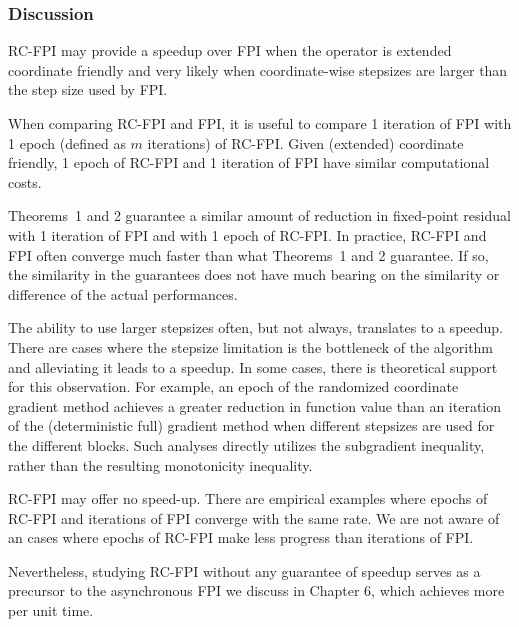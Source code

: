 \documentclass[10pt,mathserif]{beamer}
\begin{document}
\iffalse
\begin{frame}
\frametitle{Discussion}
RC-FPI may provide a speedup over FPI when the operator is extended coordinate friendly
and very likely when coordinate-wise stepsizes are larger than the step size used by FPI.

\vspace{0.2in}

When comparing RC-FPI and FPI, it is useful to compare 1 iteration of FPI with 1 epoch (defined as $m$ iterations) of RC-FPI. Given (extended) coordinate friendly, 1 epoch of RC-FPI and 1 iteration of FPI have similar computational costs.

\vspace{0.2in}
Theorems~1 and 2 guarantee a similar amount of reduction in fixed-point residual with 1 iteration of FPI and with 1 epoch of RC-FPI.
In practice, RC-FPI and FPI often converge much faster than what Theorems~1 and 2 guarantee.
If so, the similarity in the guarantees does not have much bearing on the similarity or difference of the actual performances.
\end{frame}

\begin{frame}
The ability to use larger stepsizes often, but not always, translates to a speedup.
There are cases where the stepsize limitation is the bottleneck of the algorithm and alleviating it leads to a speedup.
In some cases, there is theoretical support for this observation.
For example, an epoch of the randomized coordinate gradient method achieves a greater reduction in function value than an iteration of the (deterministic full) gradient method when different stepsizes are used for the different blocks.
Such analyses directly utilizes the subgradient inequality, rather than the resulting monotonicity inequality.
\medskip



RC-FPI may offer no speed-up. There are empirical examples where epochs of RC-FPI and iterations of FPI converge with the same rate. We are not aware of an cases where epochs of RC-FPI make less progress than iterations of FPI.
\medskip


Nevertheless, studying RC-FPI without any guarantee of speedup serves as a precursor to the asynchronous FPI we discuss in Chapter 6, which achieves more per unit time.
\end{frame}
\end{document}
